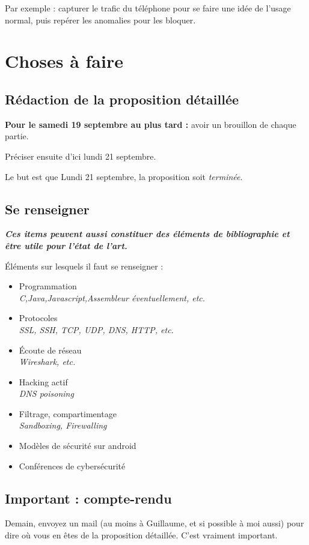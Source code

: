 \documentclass[a4paper, 11pt]{article}
\begin{document}
	Par exemple : capturer le trafic du téléphone pour se faire une idée de l'usage normal, puis repérer les anomalies pour les bloquer.
	
\section{Choses à faire}

	\subsection{Rédaction de la proposition détaillée}
	
	\textbf{\color{red} Pour le samedi 19 septembre au plus tard :} avoir un brouillon de chaque partie.
	
	Préciser ensuite d'ici lundi 21 septembre.
	
	Le but est que Lundi 21 septembre, la proposition soit \emph{\color{red} terminée}.
	
	\subsection{Se renseigner}
	
	\textbf{\itshape\color{red} Ces items peuvent aussi constituer des éléments de bibliographie et être utile pour l'état de l'art.}
	
	Éléments sur lesquels il faut se renseigner :
	\begin{itemize}
		\item Programmation \\ \emph{C,Java,Javascript,Assembleur éventuellement, etc.}
		\item Protocoles \\ \emph{SSL, SSH, TCP, UDP, DNS, HTTP, etc.}
		\item Écoute de réseau \\ \emph{Wireshark, etc.}
		\item Hacking actif \\ \emph{DNS poisoning}
		\item Filtrage, compartimentage \\ \emph{Sandboxing, Firewalling}
		\item Modèles de sécurité sur android
		\item Conférences de cybersécurité
	\end{itemize}
	
	\subsection{\color{red} Important : compte-rendu}
	
	Demain, envoyez un mail (au moins à Guillaume, et si possible à moi aussi) pour dire où vous en êtes de la proposition détaillée. C'est vraiment important.
\end{document}
